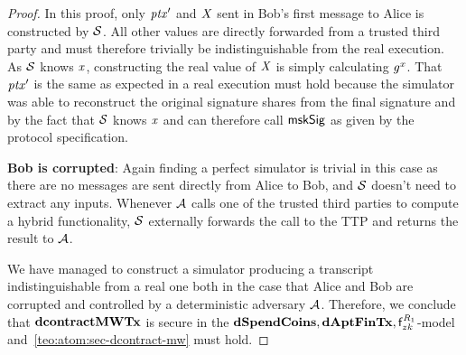 \begin{proof}
    In this proof, only ${\mathit{ptx}}'$ and $\mathit{X}$ sent in Bob's first message to Alice is constructed by $\mathcal{S}$.
    All other values are directly forwarded from a trusted third party and must therefore trivially be indistinguishable from the real execution.
    As $\mathcal{S}$ knows $\mathit{x}$, constructing the real value of $\mathit{X}$ is simply calculating $\mathit{g}^{\mathit{x}}$.
    That ${\mathit{ptx}}'$ is the same as expected in a real execution must hold because the simulator was able to reconstruct the original signature shares from the final signature and by the fact that $\mathcal{S}$ knows $\mathit{x}$ and can therefore call $\mathsf{mskSig}$ as given by the protocol specification.

    \textbf{Bob is corrupted}: Again finding a perfect simulator is trivial in this case as there are no messages are sent directly from Alice to Bob, and $\mathcal{S}$ doesn't need to extract any inputs.
    Whenever $\mathcal{A}$ calls one of the trusted third parties to compute a hybrid functionality, $\mathcal{S}$ externally forwards the call to the TTP and returns the result to $\mathcal{A}$.

    We have managed to construct a simulator producing a transcript indistinguishable from a real one both in the case that Alice and Bob are corrupted and controlled by a deterministic adversary $\mathcal{A}$. Therefore, we conclude that $\mathbf{dcontractMWTx}$ is secure in the $\mathbf{dSpendCoins},\mathbf{dAptFinTx},\mathsf{f}^{\mathit{R}_1}_{zk}$-model and~\cref{teo:atom:sec-dcontract-mw} must hold.
\end{proof}